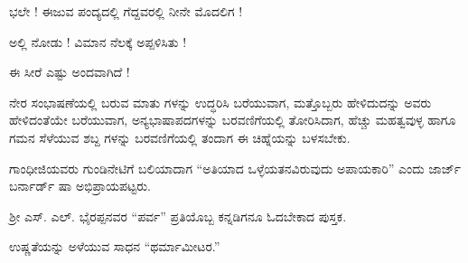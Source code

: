\vspace{3pt plus 2pt}\noindent\hspace*{1.2em}\par\vspace{1pt}

\indent ಭಲೇ ! ಈಜುವ ಪಂದ್ಯದಲ್ಲಿ ಗೆದ್ದವರಲ್ಲಿ ನೀನೇ ಮೊದಲಿಗ !\par

\noindent\hspace*{2.2em}ಅಲ್ಲಿ ನೋಡು ! ವಿಮಾನ ನೆಲಕ್ಕೆ ಅಪ್ಪಳಿಸಿತು !\par

\noindent\hspace*{2.2em}ಈ ಸೀರೆ ಎಷ್ಟು ಅಂದವಾಗಿದೆ !\par

\vspace{4pt plus 4pt minus 1pt}\hspace{0.5em}ನೇರ ಸಂಭಾಷಣೆಯಲ್ಲಿ ಬರುವ ಮಾತು ಗಳನ್ನು ಉದ್ಧರಿಸಿ ಬರೆಯುವಾಗ, ಮತ್ತೊಬ್ಬರು ಹೇಳಿದುದನ್ನು ಅವರು ಹೇಳಿದಂತೆಯೇ ಬರೆಯುವಾಗ, ಅನ್ಯಭಾಷಾಪದಗಳನ್ನು ಬರವಣಿಗೆಯಲ್ಲಿ ತೋರಿಸಿದಾಗ, ಹೆಚ್ಚು ಮಹತ್ವವುಳ್ಳ ಹಾಗೂ ಗಮನ ಸೆಳೆಯುವ ಶಬ್ದ ಗಳನ್ನು ಬರವಣಿಗೆಯಲ್ಲಿ ತಂದಾಗ ಈ ಚಿಹ್ನೆಯನ್ನು ಬಳಸಬೇಕು.\par

\vspace{3pt plus 2pt}\noindent\hspace*{1.2em}\par\vspace{1pt}

\vspace{2.5pt plus 3pt minus 0.5pt}\noindent\hspace*{1.2em}\hspace{0.55em}ಗಾಂಧೀಜಿಯವರು ಗುಂಡಿನೇಟಿಗೆ ಬಲಿಯಾದಾಗ “ಅತಿಯಾದ ಒಳ್ಳೆಯತನವಿರುವುದು ಅಪಾಯಕಾರಿ” ಎಂದು ಜಾರ್ಜ್‌ ಬರ್ನಾರ್ಡ್‌ ಷಾ ಅಭಿಪ್ರಾಯಪಟ್ಟರು.\par

\vspace{2.5pt plus 3pt minus 0.5pt}\noindent\hspace*{1.2em}\hspace{0.55em}ಶ್ರೀ ಎಸ್‌. ಎಲ್‌. ಭೈರಪ್ಪನವರ “ಪರ್ವ” ಪ್ರತಿಯೊಬ್ಬ ಕನ್ನಡಿಗನೂ ಓದಬೇಕಾದ ಪುಸ್ತಕ.\par

\vspace{2.5pt plus 3pt minus 0.5pt}\noindent\hspace*{1.2em}\hspace{0.55em}ಉಷ್ಣತೆಯನ್ನು ಅಳೆಯುವ ಸಾಧನ “ಥರ್ಮಾಮೀಟರ.”\par

